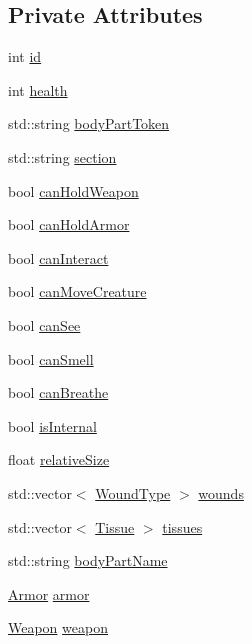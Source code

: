 \subsection*{Private Attributes}
\begin{DoxyCompactItemize}
\item 
int \mbox{\hyperlink{class_body_part_a80cddb0171a2c226800b785dadf5e436}{id}}
\item 
int \mbox{\hyperlink{class_body_part_a394f037ff6a2ecd90352f4f13a1738c5}{health}}
\item 
std\+::string \mbox{\hyperlink{class_body_part_a16affe7cdb1f3a62ecb3810dfa64f149}{body\+Part\+Token}}
\item 
std\+::string \mbox{\hyperlink{class_body_part_acb6787301261764870306dfbd4c26f07}{section}}
\item 
bool \mbox{\hyperlink{class_body_part_a2488f9de1993a94046f50ce220bdc9f7}{can\+Hold\+Weapon}}
\item 
bool \mbox{\hyperlink{class_body_part_a2b2146d740364382ac8474a6846bf645}{can\+Hold\+Armor}}
\item 
bool \mbox{\hyperlink{class_body_part_a330bff5a72221f117b1dcfdf7c15acde}{can\+Interact}}
\item 
bool \mbox{\hyperlink{class_body_part_a406b0cffe668be60a5f93e49b2d272af}{can\+Move\+Creature}}
\item 
bool \mbox{\hyperlink{class_body_part_a560b2bec8afc533d4a56efa038944c30}{can\+See}}
\item 
bool \mbox{\hyperlink{class_body_part_a5149a4f7c33db369db87e8a92c185f33}{can\+Smell}}
\item 
bool \mbox{\hyperlink{class_body_part_a1798734bbfcabb3749a84ca7916c254e}{can\+Breathe}}
\item 
bool \mbox{\hyperlink{class_body_part_a10fa01b301773bf494c2342614fea8e7}{is\+Internal}}
\item 
float \mbox{\hyperlink{class_body_part_a7be7889fa51f085c2895c050ce6d0028}{relative\+Size}}
\item 
std\+::vector$<$ \mbox{\hyperlink{_enum_types_8hpp_a585daaeecd1f9f1350c24bf0081a734e}{Wound\+Type}} $>$ \mbox{\hyperlink{class_body_part_a22bf733f773503bd1fabee639371309c}{wounds}}
\item 
std\+::vector$<$ \mbox{\hyperlink{class_tissue}{Tissue}} $>$ \mbox{\hyperlink{class_body_part_a8ae4510b40d983d1682f726c0aaed0a3}{tissues}}
\item 
std\+::string \mbox{\hyperlink{class_body_part_a403c7265219ff1f7a6ced3bb86dd67d4}{body\+Part\+Name}}
\item 
\mbox{\hyperlink{class_armor}{Armor}} \mbox{\hyperlink{class_body_part_a586f1edeb69d40a0894063f6ccc7604b}{armor}}
\item 
\mbox{\hyperlink{class_weapon}{Weapon}} \mbox{\hyperlink{class_body_part_a3d2dd4c1af200c1deb2dbf38b660f476}{weapon}}
\end{DoxyCompactItemize}

